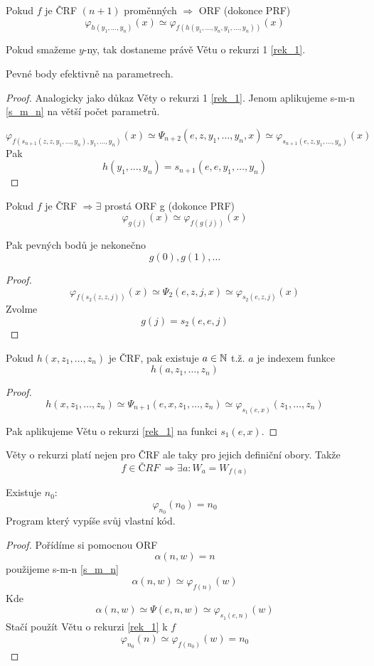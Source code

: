 \begin{theorem}[O rekurzi 2]
	Pokud $f$ je ČRF $(n + 1)$ proměnných $\Rightarrow$ ORF (dokonce PRF)
	\[ \varphi_{h(y_1, \ldots, y_n)}(x) \simeq \varphi_{f(h(y_1, \ldots, y_n, y_1, \ldots, y_n))} (x) \]

	Pokud smažeme $y$-ny, tak dostaneme právě Větu o rekurzi 1 \cref{rek_1}.

	Pevné body efektivně na parametrech.
\end{theorem}
\begin{proof}
	Analogicky jako důkaz Věty o rekurzi 1 \cref{rek_1}.
	Jenom aplikujeme s-m-n \cref{s_m_n} na větší počet parametrů.

	\[ \varphi_{f(s_{n + 1}(z, z, y_1, \ldots, y_n), y_1, \ldots, y_n)} (x) \simeq \Psi_{n + 2}(e, z, y_1, \ldots, y_n, x) \simeq \varphi_{s_{n+1}(e, z, y_1, \ldots, y_n)} (x) \]
	Pak
	\[ h(y_1, \ldots, y_n) = s_{n+1}(e, e, y_1, \ldots, y_n) \]
\end{proof}

\begin{theorem}
	Pokud $f$ je ČRF $\Rightarrow \exists$ prostá ORF g (dokonce PRF)
	\[ \varphi_{g(j)}(x) \simeq \varphi_{f(g(j))} (x) \]

	Pak pevných bodů je nekonečno
	\[ g(0), g(1), \ldots \]
\end{theorem}
\begin{proof}
	\[ \varphi_{f(s_2(z, z, j))} (x) \simeq \Psi_2(e, z, j, x) \simeq \varphi_{s_2(e, z, j)} (x) \]
	Zvolme
	\[ g(j) = s_2(e, e, j) \]
\end{proof}

\begin{theorem}[O rekurzi 3]
	Pokud $h(x, z_1, \ldots, z_n)$ je ČRF, pak existuje $a \in \operatorname{\mathbb{N}}$ t.ž. $a$ je indexem funkce
	\[ h(a, z_1, \ldots, z_n) \]
\end{theorem}
\begin{proof}
	\[ h(x, z_1, \ldots, z_n) \simeq \Psi_{n + 1}(e, x, z_1, \ldots, z_n) \simeq \varphi_{s_1(e, x)} (z_1, \ldots, z_n) \]

	Pak aplikujeme Větu o rekurzi \cref{rek_1} na funkci $s_1(e, x)$.
\end{proof}

\begin{note}
	Věty o rekurzi platí nejen pro ČRF ale taky pro jejich definiční obory.
	Takže
	\[ f \in ČRF\ \Rightarrow \exists a: W_a = W_{f(a)} \]
\end{note}

\begin{theorem}
	Existuje $n_0$:
	\[ \varphi_{n_0} (n_0) = n_0 \]
	Program který vypíše svůj vlastní kód.
\end{theorem}
\begin{proof}
	Pořídíme si pomocnou ORF
	\[ \alpha(n, w) = n \]
	použijeme s-m-n \cref{s_m_n}
	\[ \alpha(n, w) \simeq \varphi_{f(n)} (w) \]
	Kde
	\[ \alpha(n, w) \simeq \Psi(e, n, w) \simeq \varphi_{s_1(e, n)} (w) \]
	Stačí použít Větu o rekurzi \cref{rek_1} k $f$
	\[ \varphi_{n_0} (n) \simeq \varphi_{f(n_0)} (w) = n_0 \]
\end{proof}

